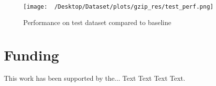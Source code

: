 \documentclass{bioinfo}
\begin{document}
\begin{figure}[!thbp]
\texttt{[image: ~/Desktop/Dataset/plots/gzip\_res/test\_perf.png]}
\caption{Performance on test dataset compared to baseline}\label{fig:01}
\end{figure}





\lipsum[1]

\section*{Funding}

This work has been supported by the... Text Text  Text Text.\vspace*{-12pt}
\end{document}

